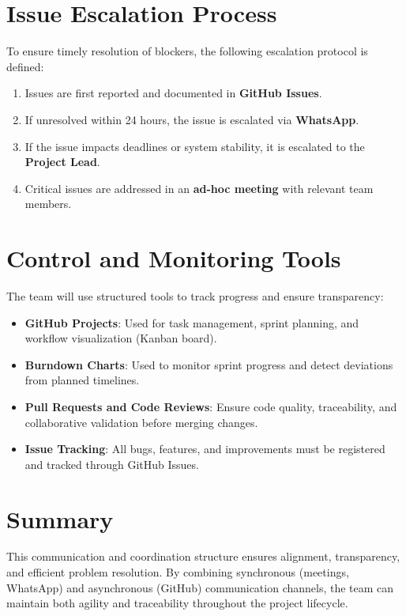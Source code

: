 \documentclass[12pt]{article}
\begin{document}
\section{Issue Escalation Process}

To ensure timely resolution of blockers, the following escalation protocol is defined:

\begin{enumerate}
    \item Issues are first reported and documented in \textbf{GitHub Issues}.
    \item If unresolved within 24 hours, the issue is escalated via \textbf{WhatsApp}.
    \item If the issue impacts deadlines or system stability, it is escalated to the \textbf{Project Lead}.
    \item Critical issues are addressed in an \textbf{ad-hoc meeting} with relevant team members.
\end{enumerate}

\section{Control and Monitoring Tools}

The team will use structured tools to track progress and ensure transparency:

\begin{itemize}
    \item \textbf{GitHub Projects}: Used for task management, sprint planning, and workflow visualization (Kanban board).
    
    \item \textbf{Burndown Charts}: Used to monitor sprint progress and detect deviations from planned timelines.
    
    \item \textbf{Pull Requests and Code Reviews}: Ensure code quality, traceability, and collaborative validation before merging changes.
    
    \item \textbf{Issue Tracking}: All bugs, features, and improvements must be registered and tracked through GitHub Issues.
\end{itemize}

\section{Summary}

This communication and coordination structure ensures alignment, transparency, and efficient problem resolution. By combining synchronous (meetings, WhatsApp) and asynchronous (GitHub) communication channels, the team can maintain both agility and traceability throughout the project lifecycle.
\end{document}
